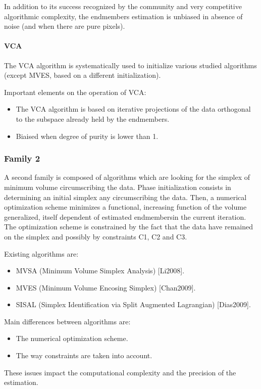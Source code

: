 In addition to its success recognized by the
community and very competitive algorithmic complexity, the endmembers estimation is unbiased in absence of noise (and when there are pure pixels).

\paragraph{VCA} 
The VCA algorithm is systematically
used to initialize various studied algorithms (except
MVES, based on a different initialization).

Important elements on the operation of VCA:
\begin{itemize}
\item {The VCA algorithm
is based on iterative projections of the data orthogonal to
the subspace already held by the endmembers.}
\item {Biaised when degree of purity is lower than 1.}
\end{itemize}  

\subsubsection{Family 2} 
A second family is composed of algorithms which are looking for the simplex of minimum
volume circumscribing the data. Phase initialization consists in determining
an initial simplex any circumscribing the data. Then, a numerical
optimization scheme minimizes a functional, increasing function of the
volume generalized, itself dependent of estimated endmembersin the
current iteration. The optimization scheme is constrained by the fact that the
data have remained on the simplex and possibly by constraints C1, C2 and C3.

Existing algorithms are: 
\begin{itemize}
\item {MVSA (Minimum Volume Simplex
Analysis) [Li2008].}
\item { MVES (Minimum Volume Encosing Simplex)
[Chan2009].}
\item {SISAL (Simplex Identification via Split Augmented
Lagrangian) [Dias2009].}
\end{itemize}  
  
Main differences between algorithms are: 
\begin{itemize}
\item {The numerical optimization scheme.}
\item {The way
constraints are taken into account.}

\end{itemize}  
These issues impact the computational complexity and the precision of the estimation.
 

